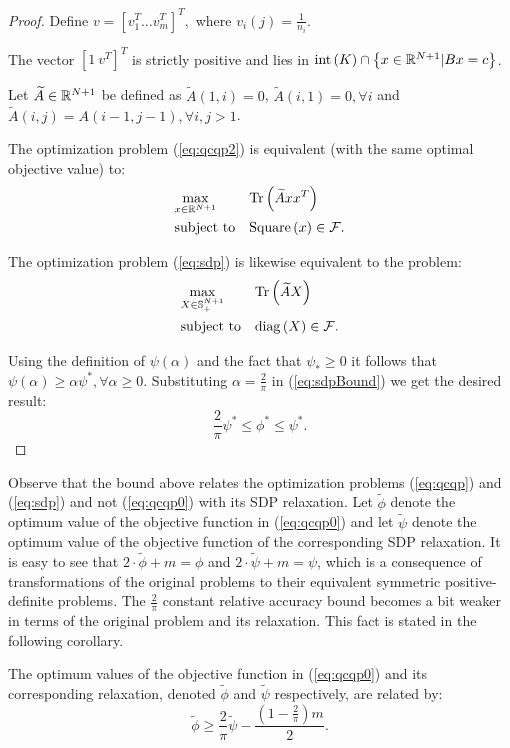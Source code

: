\begin{proof}
Define $v = \left[v_1^T \ldots v_m^T\right]^T,$ where $v_i\left(j\right) = \frac{1}{n_i}$.

The vector $\left[1~ v^{T}\right]^T$ is strictly positive and lies in $\mathrm{int}\left(K\right) \cap \left\{x \in \mathbb{R}^{N+1} | B x = c \right\}$.

Let $\widetilde{A} \in \mathbb{R}^{N+1}$ be defined as $\widetilde{A}\left(1,i\right) = 0$, 
$\widetilde{A}\left(i,1\right) = 0, \forall i$ and $\widetilde{A}\left(i,j\right) = A\left(i-1,j-1\right), \forall i,j > 1$.

The optimization problem (\ref{eq:qcqp2}) is equivalent (with
 the same optimal objective value) to:
\begin{equation*}
\begin{aligned}
& \underset{x \in \mathbb{R}^{N+1}}{\text{max}}
& &\mathrm{Tr}\left(\widetilde{A} x x^T\right) \\
& \text{subject to}
& &\mathrm{Square}\left(x\right) \in \mathcal{F}.\\
\end{aligned}
\end{equation*}

The optimization problem (\ref{eq:sdp}) is likewise equivalent to the problem:
\begin{equation*}
\begin{aligned}
& \underset{X \in \mathbb{S}_{+}^{N+1}}{\text{max}}
& &\mathrm{Tr}\left(\widetilde{A} X\right) \\
& \text{subject to}
& &\mathrm{diag}\left(X\right) \in \mathcal{F}.\\
\end{aligned}
\end{equation*}

Using the definition of $\psi\left(\alpha\right)$ and the fact that $\psi_* \geq 0$ it follows 
that $\psi\left(\alpha\right) \geq \alpha \psi^* ,\forall \alpha \geq 0$. Substituting 
$\alpha = \frac{2}{\pi}$ in (\ref{eq:sdpBound}) we get the desired result:
$$\frac{2}{\pi} \psi^* \leq \phi^* \leq \psi^*.$$
\end{proof}

Observe that the bound above relates the optimization problems (\ref{eq:qcqp}) and (\ref{eq:sdp}) 
and not (\ref{eq:qcqp0}) with its SDP relaxation. Let $\widetilde{\phi}$ denote the optimum value 
of the objective function in (\ref{eq:qcqp0}) and let $\widetilde{\psi}$ denote the optimum value 
of the objective function of the corresponding SDP relaxation. It is easy to see that 
$2 \cdot \widetilde{\phi} + m = \phi$ and $2 \cdot \widetilde{\psi} + m = \psi$, which is a 
consequence of transformations of the original problems to their equivalent symmetric 
positive-definite problems. The $\frac{2}{\pi}$ constant relative accuracy bound becomes a bit 
weaker in terms of the original problem and its relaxation. This fact is stated in the following corollary.
\begin{corollary}
The optimum values of the objective function in (\ref{eq:qcqp0}) and its corresponding relaxation, 
denoted $\widetilde{\phi}$ and $\widetilde{\psi}$ respectively, are related by:
$$\widetilde{\phi} \geq \frac{2}{\pi} \widetilde{\psi} - \frac{(1 - \frac{2}{\pi}) m}{2}.$$
\end{corollary}

